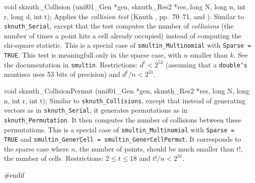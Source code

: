 void sknuth_Collision (unif01_Gen *gen, sknuth_Res2 *res,
                       long N, long n, int r, long d, int t);
\endcode
  \tab 
   Applies the {\em collision test\/}
  (Knuth \cite{rKNU98a},  pp.~70--71, and \cite{rLEC02c}).
   Similar to {\tt sknuth\_Serial}, except that the test computes the
   number of {\em collisions\/} (the number of times a point hits a cell
   already occupied) instead of computing the chi-square statistic.
   This is a special case of {\tt smultin\_Multinomial} with
   {\tt Sparse = TRUE}.  This test is meaningfull only in the sparse case,
   with $n$ smaller than $k$.  See the documentation in {\tt smultin}.
   Restrictions: $d^t < 2^{53}$ (assuming that a {\tt double's} mantissa
   uses 53 bits of precision) and $d^{t}/n < 2^{31}$.
  \endtab
\code


void sknuth_CollisionPermut (unif01_Gen *gen, sknuth_Res2 *res,
                             long N, long n, int r, int t);
\endcode
  \tab
   Similar to {\tt sknuth\_Collisions},
   except that
   instead of generating  vectors as in {\tt sknuth\_Serial},
   it generates permutations as in {\tt sknuth\_Permutation}.
   It then computes the number of collisions between these permutations.
   This is a special case of {\tt smultin\_Multinomial} with
   {\tt Sparse = TRUE} and 
  {\tt smultin\_Gener\-Cell = smultin\_GenerCellPermut}. 
   It corresponds to the sparse case where $n$, the number of points, 
   should be much smaller than  $t!$, the number of cells. 
   Restrictions: $2 \le t \le 18 $ and $ t!/n < 2^{31}$.
  \endtab

\code
\hide
#endif
\endhide
\endcode


